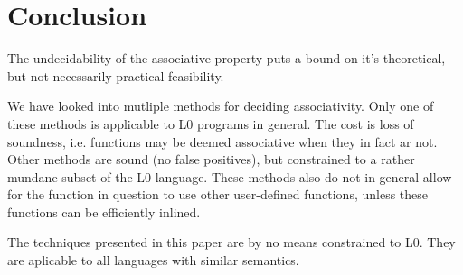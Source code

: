 \section{Conclusion}

The undecidability of the associative property puts a bound on it's
theoretical, but not necessarily practical feasibility.

We have looked into mutliple methods for deciding associativity. Only one of
these methods is applicable to L0 programs in general. The cost is loss of
soundness, i.e. functions may be deemed associative when they in fact ar not.
Other methods are sound (no false positives), but constrained to a rather
mundane subset of the L0 language. These methods also do not in general allow
for the function in question to use other user-defined functions, unless these
functions can be efficiently inlined.

The techniques presented in this paper are by no means constrained to L0. They
are aplicable to all languages with similar semantics.

